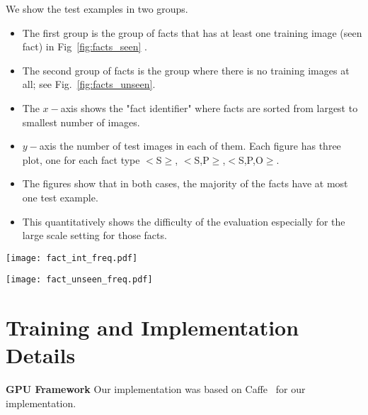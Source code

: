 \documentclass[runningheads]{llncs}
\begin{document}
We show the test examples in two groups. 

\begin{itemize}
	\item The first group is the group of facts that has at least one training image (seen fact) in Fig~\ref{fig:facts_seen} . 
\item The second group of facts is the group where there is no training images at all; see Fig.~\ref{fig:facts_unseen}. 
\item The $x-$axis  shows the "fact identifier" where facts are sorted from largest to smallest number of images.
\item $y-$axis the number of test images in each of them. Each figure has three plot, one for each fact type $<$S$\ge$, $<$S,P$\ge$,$<$S,P,O$\ge$. 
\item The figures show that  in both cases, the majority of the facts have at most one test example. 
\item This quantitatively shows the difficulty of the evaluation especially for the large scale setting for those facts. 
\end{itemize}







\begin{figure*}[ht!]
  \centering
    \texttt{[image: fact\_int\_freq.pdf]}

     \caption{26,740 unique test facts that have at least one training example (seen facts), total of 136,040  images ($x-$ axis shows these facts, $y-$ axis shows the number of test images per each fact)}
     \label{fig:facts_seen}
\end{figure*}
\begin{figure*}[ht!]
  \centering
    \texttt{[image: fact\_unseen\_freq.pdf]}
     \caption{31,677 unique unseen test facts, total of 32,651 images ($x-$ axis shows  these facts, $y-$ axis shows the number of test images per each fact)}
     \label{fig:facts_unseen}
\end{figure*}








\clearpage
\section{Training and Implementation Details}
\textbf{GPU Framework} Our implementation was based on Caffe~\cite{jia2014caffe} for our implementation. 
\end{document}
